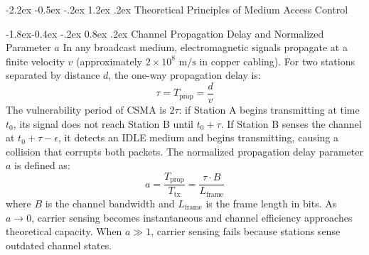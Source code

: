 \documentclass[11pt,a4paper]{article}
\makeatletter
\renewcommand\section{\@startsection {section}{1}{\z@}%
                                   {-2.2ex \@plus -0.5ex \@minus -.2ex}%
                                   {1.2ex \@plus.2ex}%
                                   {\normalfont\Large\bfseries}}
\renewcommand\subsection{\@startsection{subsection}{2}{\z@}%
                                     {-1.8ex\@plus -0.4ex \@minus -.2ex}%
                                     {0.8ex \@plus .2ex}%
                                     {\normalfont\large\bfseries}}
\makeatother
\begin{document}
\section{Theoretical Principles of Medium Access Control}

\subsection{Channel Propagation Delay and Normalized Parameter \texorpdfstring{$a$}{a}}
In any broadcast medium, electromagnetic signals propagate at a finite velocity $v$ (approximately $2 \times 10^8\text{ m/s}$ in copper cabling). For two stations separated by distance $d$, the one-way propagation delay is:
\begin{equation}
    \tau = T_{\text{prop}} = \frac{d}{v}
\end{equation}
The vulnerability period of CSMA is $2\tau$: if Station A begins transmitting at time $t_0$, its signal does not reach Station B until $t_0 + \tau$. If Station B senses the channel at $t_0 + \tau - \epsilon$, it detects an IDLE medium and begins transmitting, causing a collision that corrupts both packets. The normalized propagation delay parameter $a$ is defined as:
\begin{equation}
    a = \frac{T_{\text{prop}}}{T_{\text{tx}}} = \frac{\tau \cdot B}{L_{\text{frame}}}
\end{equation}
where $B$ is the channel bandwidth and $L_{\text{frame}}$ is the frame length in bits. As $a \to 0$, carrier sensing becomes instantaneous and channel efficiency approaches theoretical capacity. When $a \gg 1$, carrier sensing fails because stations sense outdated channel states.
\end{document}

